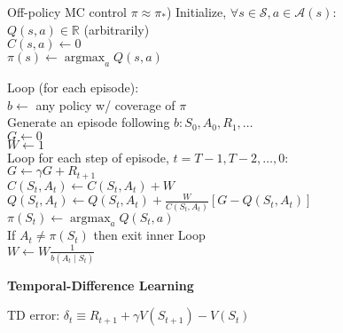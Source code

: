 \documentclass[twocolumn]{article}
\DeclareMathOperator*{\argmax}{argmax}
\begin{document}
\begin{mydef}{Off-policy MC control $\pi \approx \pi_*$)}{}
    Initialize, $\forall s \in \mathcal S, a \in \mathcal A(s)$: \\
        \hspace*{2em}$Q(s,a) \in \mathbb R$ (arbitrarily) \\
        \hspace*{2em}$C(s,a) \leftarrow 0$ \\
        \hspace*{2em}$\pi(s) \leftarrow \argmax_a Q(s, a)$
    
        Loop (for each episode): \\
            \hspace*{2em}$b\leftarrow$ any policy w/ coverage of $\pi$ \\
            \hspace*{2em}Generate an episode following $b: S_0, A_0, R_1, \dots$ \\
            \hspace*{2em}$G \leftarrow 0$ \\
            \hspace*{2em}$W \leftarrow 1$ \\
            \hspace*{2em}Loop for each step of episode, $t = T-1, T-2, \dots, 0$: \\
                \hspace*{4em}$G \leftarrow \gamma G + R_{t+1}$ \\
                \hspace*{4em}$C(S_t, A_t) \leftarrow C(S_t, A_t) + W$ \\
                \hspace*{4em}$Q(S_t, A_t) \leftarrow Q(S_t, A_t) + \frac{W}{C(S_t, A_t)} [G - Q(S_t, A_t)]$ \\
                \hspace*{4em}$\pi(S_t) \leftarrow \argmax_a Q(S_t, a)$ \\
                \hspace*{4em}If $A_t \neq \pi(S_t)$ then exit inner Loop \\
                \hspace*{4em}$W \leftarrow W \frac{1}{b(A_t \mid S_t)}$
\end{mydef}

\dotfill

\textbf{Temporal-Difference Learning}

TD error: $\delta_t \equiv R_{t+1} + \gamma V(S_{t+1}) - V(S_t)$
\end{document}
